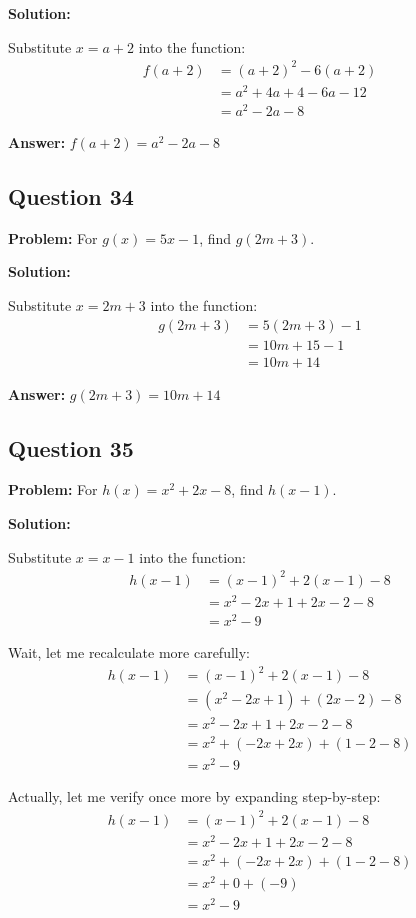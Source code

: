 \documentclass[12pt]{article}
\begin{document}
\textbf{Solution:}

Substitute $x = a+2$ into the function:
\begin{align*}
f(a+2) &= (a+2)^2 - 6(a+2) \\
&= a^2 + 4a + 4 - 6a - 12 \\
&= a^2 - 2a - 8
\end{align*}

\textbf{Answer:} $\boxed{f(a+2) = a^2 - 2a - 8}$

\subsection*{Question 34}
\textbf{Problem:} For $g(x) = 5x - 1$, find $g(2m + 3)$.

\textbf{Solution:}

Substitute $x = 2m + 3$ into the function:
\begin{align*}
g(2m+3) &= 5(2m+3) - 1 \\
&= 10m + 15 - 1 \\
&= 10m + 14
\end{align*}

\textbf{Answer:} $\boxed{g(2m+3) = 10m + 14}$

\subsection*{Question 35}
\textbf{Problem:} For $h(x) = x^2 + 2x - 8$, find $h(x-1)$.

\textbf{Solution:}

Substitute $x = x-1$ into the function:
\begin{align*}
h(x-1) &= (x-1)^2 + 2(x-1) - 8 \\
&= x^2 - 2x + 1 + 2x - 2 - 8 \\
&= x^2 - 9
\end{align*}

Wait, let me recalculate more carefully:
\begin{align*}
h(x-1) &= (x-1)^2 + 2(x-1) - 8 \\
&= (x^2 - 2x + 1) + (2x - 2) - 8 \\
&= x^2 - 2x + 1 + 2x - 2 - 8 \\
&= x^2 + (- 2x + 2x) + (1 - 2 - 8) \\
&= x^2 - 9
\end{align*}

Actually, let me verify once more by expanding step-by-step:
\begin{align*}
h(x-1) &= (x-1)^2 + 2(x-1) - 8 \\
&= x^2 - 2x + 1 + 2x - 2 - 8 \\
&= x^2 + (-2x + 2x) + (1 - 2 - 8) \\
&= x^2 + 0 + (-9) \\
&= x^2 - 9
\end{align*}
\end{document}
